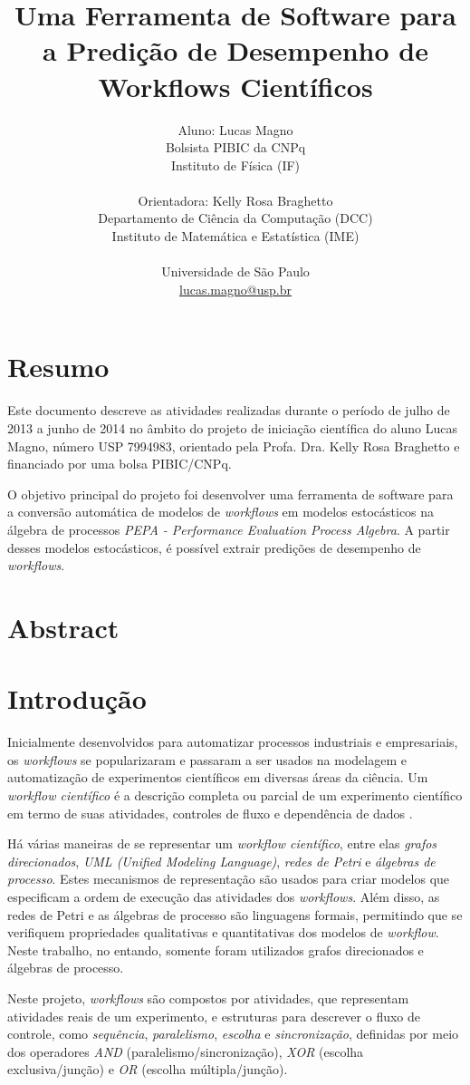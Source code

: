 \documentclass[a4paper,11pt]{article}
\date{}
\title{
    Uma Ferramenta de Software para a Predição de Desempenho de Workflows Científicos
}
\author{
    Aluno: Lucas Magno \\
    Bolsista PIBIC da CNPq \\
    Instituto de Física (IF) \\
    \\
    Orientadora: Kelly Rosa Braghetto\\
    Departamento de Ciência da Computação (DCC) \\
    Instituto de Matemática e Estatística (IME) \\
    \\
    Universidade de São Paulo \\
    \href{mailto:lucas.magno@usp.br}{lucas.magno@usp.br}
}
\begin{document}
    \maketitle
    \section*{Resumo}
    Este documento descreve as atividades realizadas durante o período de julho de 2013 a junho de 2014 no âmbito do projeto de iniciação científica do aluno Lucas Magno, número USP 7994983, orientado pela Profa. Dra. Kelly Rosa Braghetto e financiado por uma bolsa PIBIC/CNPq.

    O objetivo principal do projeto foi desenvolver uma ferramenta de software para a conversão automática de modelos de \emph{workflows} em modelos estocásticos na álgebra de processos \emph{PEPA - Performance Evaluation Process Algebra}. A partir desses modelos estocásticos, é possível extrair predições de desempenho de \emph{workflows}.
    \section*{Abstract}

    \newpage
    \section{Introdução}
        Inicialmente desenvolvidos para automatizar processos industriais e empresariais, os \emph{workflows} se popularizaram e passaram a ser usados na modelagem e automatização de experimentos científicos em diversas áreas da ciência. Um \emph{workflow científico} é a descrição completa ou parcial de um experimento científico em termo de suas atividades, controles de fluxo e dependência de dados \cite{phd:gadelha12}.

        Há várias maneiras de se representar um \emph{workflow científico}, entre elas \emph{grafos direcionados}, \emph{UML \emph{(Unified Modeling Language)}}, \emph{redes de Petri} e \emph{álgebras de processo}. Estes mecanismos de representação são usados para criar modelos que especificam a ordem de execução das atividades dos \emph{workflows}. Além disso, as redes de Petri e as álgebras de processo são linguagens formais, permitindo que se verifiquem propriedades qualitativas e quantitativas dos modelos de \emph{workflow}. Neste trabalho, no entando, somente foram utilizados grafos direcionados e álgebras de processo.

    Neste projeto, \emph{workflows} são compostos por atividades, que representam atividades reais de um experimento, e estruturas para descrever o fluxo de controle, como \emph{sequência}, \emph{paralelismo}, \emph{escolha} e \emph{sincronização}, definidas por meio dos operadores \emph{AND} (paralelismo/sincronização), \emph{XOR} (escolha exclusiva/junção) e \emph{OR} (escolha múltipla/junção).
\end{document}
